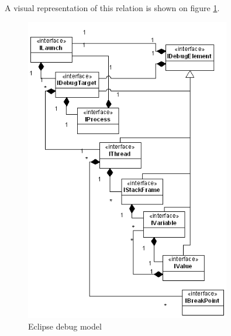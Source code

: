 A visual representation of this relation is shown on figure \ref{fig:debug_model}.
\begin{figure}[htb]
\centering
\includegraphics[width=0.8\textwidth]{figures/debug_model}
\caption{Eclipse debug model}
\label{fig:debug_model}
\end{figure}
